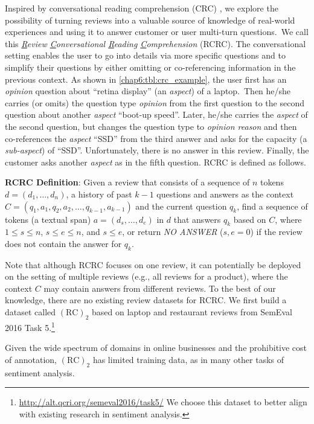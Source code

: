     
Inspired by conversational reading comprehension (CRC) \cite{reddy2018coqa,choi2018quac,xu-etal-2019-bert}, we explore the possibility of turning reviews into a valuable source of knowledge of real-world experiences and using it to answer customer or user multi-turn questions.~We call this \textit{\underline{R}eview \underline{C}onversational \underline{R}eading \underline{C}omprehension} (RCRC).
The conversational setting enables the user to go into details via more specific questions and to simplify their questions by either omitting or co-referencing information in the previous context.
As shown in \ref{chap6:tbl:crc_example}, 
the user first has an \textit{opinion} question about ``retina display'' (an \textit{aspect}) of a laptop.~Then he/she carries (or omits) the question type \textit{opinion} from the first question to the second question about another \textit{aspect} ``boot-up speed''.
Later, he/she carries the \textit{aspect} of the second question, but changes the question type to \textit{opinion reason} and then co-references the \textit{aspect} ``SSD'' from the third answer and asks for the capacity (a \textit{sub-aspect}) of ``SSD''.
Unfortunately, there is no answer in this review. 
Finally, the customer asks another \textit{aspect} as in the fifth question. RCRC is defined as follows.

\noindent\textbf{RCRC Definition}: Given a review that consists of a sequence of $n$ tokens $d=(d_1, \dots, d_n)$, a history of past $k-1$ questions and answers as the context $C=(q_1, a_1, q_2, a_2, \dots, q_{k-1}, a_{k-1})$ and the current question $q_k$, find a sequence of tokens (a textual span) $a=(d_s, \dots, d_e)$ in $d$ that answers $q_k$ based on $C$, where $1 \le s \le n$, $s\le e \le n$, and $s\le e$, or return \textit{NO ANSWER} ($s, e=0$) if the review does not contain the answer for $q_k$.

Note that although RCRC focuses on one review, it can potentially be deployed on the setting of multiple reviews (e.g., all reviews for a product), where the context $C$ may contain answers from different reviews.
To the best of our knowledge, there are no existing review datasets for RCRC. We first build a dataset called $(\text{RC})_2$ based on laptop and restaurant reviews from SemEval 2016 Task 5.\footnote{\url{http://alt.qcri.org/semeval2016/task5/} We choose this dataset to better align with existing research in sentiment analysis.} 

Given the wide spectrum of domains in online businesses and the prohibitive cost of annotation, $(\text{RC})_2$ has limited training data,
as in many other tasks of sentiment analysis.

